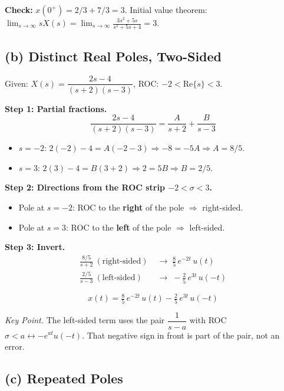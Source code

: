 \documentclass[11pt]{article}
\newcommand{\Res}{\mathrm{Re}}
\begin{document}
\textbf{Check:} $x(0^+) = 2/3 + 7/3 = 3$. Initial value theorem:
$\displaystyle\lim_{s\to\infty}sX(s) = \lim_{s\to\infty}\frac{3s^2+5s}{s^2+5s+4} = 3$. \checkmark

\subsection*{(b) Distinct Real Poles, Two-Sided}

Given: $X(s) = \dfrac{2s-4}{(s+2)(s-3)}$, ROC: $-2 < \Res\{s\} < 3$.

\textbf{Step 1: Partial fractions.}
\[
\frac{2s-4}{(s+2)(s-3)} = \frac{A}{s+2} + \frac{B}{s-3}
\]
\begin{itemize}[leftmargin=2em]
\item $s=-2$: $2(-2)-4 = A(-2-3) \Rightarrow -8 = -5A \Rightarrow A = 8/5$.
\item $s=3$: $2(3)-4 = B(3+2) \Rightarrow 2 = 5B \Rightarrow B = 2/5$.
\end{itemize}

\textbf{Step 2: Directions from the ROC strip $-2 < \sigma < 3$.}
\begin{itemize}[leftmargin=2em]
\item Pole at $s=-2$: ROC to the \textbf{right} of the pole $\Rightarrow$ right-sided.
\item Pole at $s= 3$: ROC to the \textbf{left}  of the pole $\Rightarrow$ left-sided.
\end{itemize}

\textbf{Step 3: Invert.}
\begin{align*}
\frac{8/5}{s+2}\ (\text{right-sided}) &\;\longrightarrow\; \tfrac{8}{5}\,e^{-2t}\,u(t) \\
\frac{2/5}{s-3}\ (\text{left-sided})  &\;\longrightarrow\; -\tfrac{2}{5}\,e^{3t}\,u(-t)
\end{align*}

\begin{equation*}
\boxed{x(t) = \tfrac{8}{5}\,e^{-2t}\,u(t) - \tfrac{2}{5}\,e^{3t}\,u(-t)}
\end{equation*}

\medskip
\noindent\textit{Key Point.} The left-sided term uses the pair $\dfrac{1}{s-a}$ with ROC
$\sigma < a \longleftrightarrow -e^{at}u(-t)$. That negative sign in front is part of the pair,
not an error.

\subsection*{(c) Repeated Poles}
\end{document}
